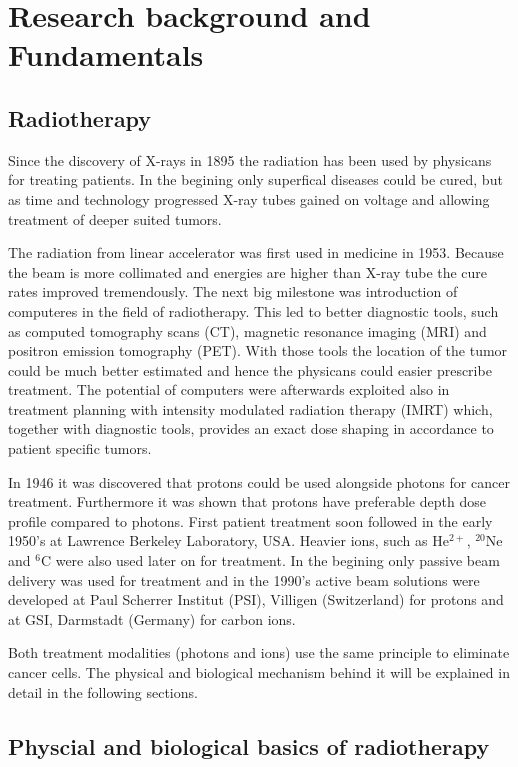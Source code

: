 \documentclass[type=dr, dr=rernat, accentcolor=tud7b,colorbacktitle, bigchapter, openright, twoside, 12pt ]{tudthesis}
\begin{document}
\chapter{Research background and Fundamentals}
\label{chapter:intro}
\minitoc

\section{Radiotherapy}

Since the discovery of X-rays in 1895 the radiation has been used by physicans for treating patients. 
In the begining only superfical diseases could be cured, but as time and technology progressed X-ray tubes gained on voltage
and allowing treatment of deeper suited tumors.

The radiation from linear accelerator was first used in medicine in 1953. Because the beam is more collimated and energies are
higher than X-ray tube the cure rates improved tremendously. The next big milestone was introduction of computeres in the field
of radiotherapy. This led to better diagnostic tools, such as computed tomography scans (CT), magnetic resonance imaging (MRI) and
positron emission tomography (PET). With those tools the location of the tumor could be much better estimated and hence the physicans
could easier prescribe treatment. The potential of computers were afterwards exploited also in treatment planning with intensity modulated
radiation therapy (IMRT) which, together with diagnostic tools, provides an exact dose shaping in accordance to patient specific tumors.

In 1946 it was discovered that protons could be used alongside photons for cancer treatment. Furthermore it was shown that protons have preferable depth dose profile 
compared to photons. First patient treatment soon followed in the early 1950's at Lawrence Berkeley Laboratory, USA. Heavier ions, such as 
He$^{2+}$, $^{20}$Ne and $^6$C were also used later on for treatment. In the begining only passive beam delivery was used for treatment 
and in the 1990's active beam solutions were developed at Paul Scherrer Institut (PSI), Villigen (Switzerland) for protons and at GSI, Darmstadt 
(Germany) for carbon ions.

Both treatment modalities (photons and ions) use the same principle to eliminate cancer cells. The physical and biological mechanism behind 
it will be explained in detail in the following sections.


\section{Physcial and biological basics of radiotherapy}
\end{document}
